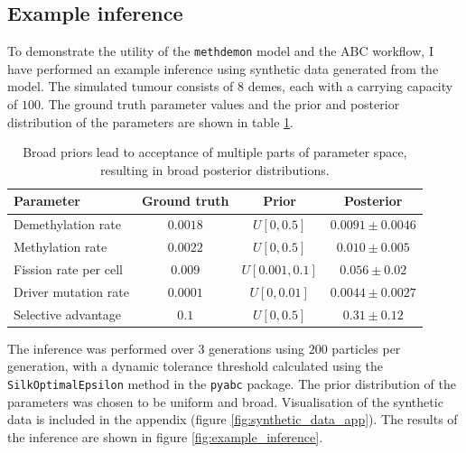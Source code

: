 \subsection{Example inference}
To demonstrate the utility of the \texttt{methdemon} model and the ABC workflow,
I have performed an example inference using synthetic data generated from the
model. The simulated tumour consists of $8$ demes, each with a carrying capacity
of $100$. The ground truth parameter values and the prior and posterior
distribution of the parameters are shown in table \ref{table:example_inference}.
\begin{table}[htbp]
    \centering
    \begin{tabularx}{\textwidth}{|X|c|c|c|}
        \hline
        Parameter & Ground truth & Prior & Posterior \\ \hline
        Demethylation rate & $0.0018$ & $U[0, 0.5]$ & $0.0091 \pm 0.0046$ \\
        \hline
        Methylation rate & $0.0022$ & $U[0, 0.5]$ & $0.010 \pm 0.005$ \\ \hline
        Fission rate per cell & $0.009$ & $U[0.001, 0.1]$ & $0.056\pm 0.02$ \\
        \hline
        Driver mutation rate & $0.0001$ & $U[0, 0.01]$ & $0.0044 \pm 0.0027$ \\
        \hline
        Selective advantage & $0.1$ & $U[0, 0.5]$ & $0.31\pm0.12$ \\ \hline
    \end{tabularx}
    \caption{Broad priors lead to acceptance of multiple parts of parameter
    space, resulting in broad posterior distributions.}
    \label{table:example_inference}
\end{table}
The inference was performed over $3$ generations using $200$ particles per
generation, with a dynamic tolerance threshold calculated using the
\texttt{SilkOptimalEpsilon} method in the \texttt{pyabc} package. The prior
distribution of the parameters was chosen to be uniform and broad.
Visualisation of the synthetic data is included in the appendix (figure
\ref{fig:synthetic_data_app}). The results of the inference are shown in figure
\ref{fig:example_inference}.
